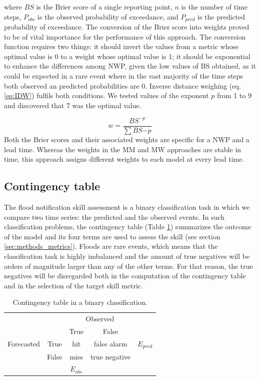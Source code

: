 \documentclass[preprint,12pt]{elsarticle}
\begin{document}
where $BS$  is the Brier score of a single reporting point, $n$  is the number of time steps, $P_{obs}$ is the observed probability of exceedance, and $P_{pred}$  is the predicted probability of exceedance. The conversion of the Brier score into weights proved to be of vital importance for the performance of this approach. The conversion function requires two things: it should invert the values from a metric whose optimal value is 0 to a weight whose optimal value is 1; it should be exponential to enhance the differences among NWP, given the low values of BS obtained, as it could be expected in a rare event where in the vast majority of the time steps both observed an predicted probabilities are 0. Inverse distance weighing (eq. \ref{eq:IDW}) fulfils both conditions. We tested values of the exponent $p$ from 1 to 9 and discovered that 7 was the optimal value.
    
\begin{equation}
    \label{eq:IDW}
    w = \frac{BS^{-p}}{\sum BS{-p}}
\end{equation}
Both the Brier scores and their associated weights are specific for a NWP and a lead time. Whereas the weights in the MM and MW approaches are stable in time, this approach assigns different weights to each model at every lead time.

\subsection{Contingency table}
\label{sec:methods_contingency}

The flood notification skill assessment is a binary classification task in which we compare two time series: the predicted and the observed events. In such classification  problems, the contingency table (Table \ref{tab:contingency_table}) summarizes the outcome of the model and its four terms are used to assess the skill (see section \ref{sec:methods_metrics}). Floods are rare events, which means that the classification task is highly imbalanced and the amount of true negatives will be orders of magnitude larger than any of the other terms. For that reason, the true negatives will be disregarded both in the computation of the contingency table and in the selection of the target skill metric.

\begin{table}
    \centering
    \caption{Contingency table in a binary classification.}
    \footnotesize
    \begin{tabular}{ccccc}
        \toprule
        & & \multicolumn{2}{c}{Observed} & \\
        \cmidrule{3-4}
        & & True & False & \\
        \midrule
        Forecasted & True & hit & false alarm & $E_{pred}$ \\
        & False & miss & true negative & \\
        &  & $E_{obs}$ & & \\
        \bottomrule
    \end{tabular}
    \label{tab:contingency_table}
\end{table}
\end{document}
